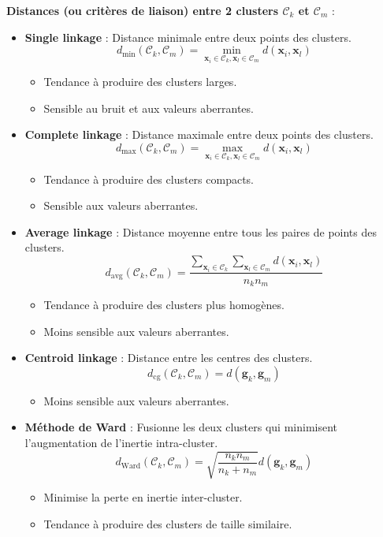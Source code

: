 \documentclass[10pt,a4paper]{article}
\begin{document}
\textbf{Distances (ou critères de liaison) entre 2 clusters $\mathcal{C}_k$ et $\mathcal{C}_m$} :
\begin{itemize}
    \item \textbf{Single linkage} : Distance minimale entre deux points des clusters.
    $$d_{\text{min}}(\mathcal{C}_k, \mathcal{C}_m) = \min_{\mathbf{x}_i \in \mathcal{C}_k, \mathbf{x}_l \in \mathcal{C}_m} d(\mathbf{x}_i, \mathbf{x}_l)$$
    \begin{itemize}
        \item Tendance à produire des clusters larges.
        \item Sensible au bruit et aux valeurs aberrantes.
    \end{itemize}
    \item \textbf{Complete linkage} : Distance maximale entre deux points des clusters.
    $$d_{\text{max}}(\mathcal{C}_k, \mathcal{C}_m) = \max_{\mathbf{x}_i \in \mathcal{C}_k, \mathbf{x}_l \in \mathcal{C}_m} d(\mathbf{x}_i, \mathbf{x}_l)$$
    \begin{itemize}
        \item Tendance à produire des clusters compacts.
        \item Sensible aux valeurs aberrantes.
    \end{itemize}
    \item \textbf{Average linkage} : Distance moyenne entre tous les paires de points des clusters.
    $$d_{\text{avg}}(\mathcal{C}_k, \mathcal{C}_m) = \frac{\sum_{\mathbf{x}_i \in \mathcal{C}_k} \sum_{\mathbf{x}_l \in \mathcal{C}_m} d(\mathbf{x}_i, \mathbf{x}_l)}{n_k n_m}$$
    \begin{itemize}
        \item Tendance à produire des clusters plus homogènes.
        \item Moins sensible aux valeurs aberrantes.
    \end{itemize}
    \item \textbf{Centroid linkage} : Distance entre les centres des clusters.
    $$d_{\text{cg}}(\mathcal{C}_k, \mathcal{C}_m) = d(\mathbf{g}_k, \mathbf{g}_m)$$
    \begin{itemize}
        \item Moins sensible aux valeurs aberrantes.
    \end{itemize}
    \item \textbf{Méthode de Ward} : Fusionne les deux clusters qui minimisent l'augmentation de l'inertie intra-cluster.
    $$d_{\text{Ward}}(\mathcal{C}_k, \mathcal{C}_m) = \sqrt{\frac{n_k n_m}{n_k + n_m}} d(\mathbf{g}_k, \mathbf{g}_m)$$
    \begin{itemize}
        \item Minimise la perte en inertie inter-cluster.
        \item Tendance à produire des clusters de taille similaire.
    \end{itemize}
\end{itemize}
\end{document}

